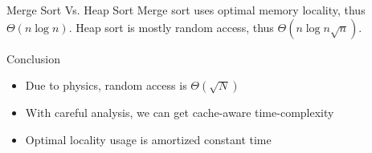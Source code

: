 \documentclass{beamer}
\begin{document}
\begin{frame}{Merge Sort Vs. Heap Sort}
Merge sort uses optimal memory locality, thus $\Theta(n\log n)$. Heap sort is mostly random access, thus $\Theta(n\log n \sqrt{n})$.


\end{frame}



\begin{frame}{Conclusion}
\begin{itemize}
  \item Due to physics, random access is $\Theta(\sqrt{N})$
  \item With careful analysis, we can get cache-aware time-complexity
  \item Optimal locality usage is amortized constant time
\end{itemize}
\end{frame}
\end{document}
